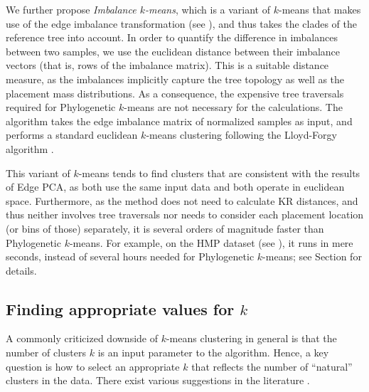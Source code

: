 We further propose \emph{Imbalance $k$-means},
which is a variant of $k$-means that makes use of the edge imbalance transformation
(see ),
and thus takes the clades of the reference tree into account.
In order to quantify the difference in imbalances between two samples,
we use the euclidean distance between their imbalance vectors (that is, rows of the imbalance matrix).
This is a suitable distance measure,
as the imbalances implicitly capture the tree topology as well as the placement mass distributions.
As a consequence, the expensive tree traversals required for Phylogenetic $k$-means are not necessary for the calculations.
The algorithm takes the edge imbalance matrix of normalized samples as input,
and performs a standard euclidean $k$-means clustering following the Lloyd-Forgy algorithm \cite{Lloyd1982,Forgy1965}.

This variant of $k$-means tends to find clusters that are consistent with the results of Edge PCA,
as both use the same input data and both operate in euclidean space. %
Furthermore, as the method does not need to calculate KR distances,
and thus neither involves tree traversals nor needs to consider each placement location (or bins of those) separately,
it is several orders of magnitude faster than Phylogenetic $k$-means.
For example, on the \ac{HMP} dataset (see ),
it runs in mere seconds, instead of several hours needed for Phylogenetic $k$-means;
see Section  for details.


\subsection{Finding appropriate values for \texorpdfstring{$k$}{k}}
\label{ch:Clustering:sec:Methods:sub:FindingK}

A commonly criticized downside of $k$-means clustering in general is
that the number of clusters $k$ is an input parameter to the algorithm.
Hence, a key question is how to select an appropriate $k$
that reflects the number of ``natural'' clusters in the data.
There exist various suggestions in the literature
\cite{Thorndike1953,Rousseeuw1987,Bischof1999,Pelleg2000,Tibshirani2001,Hamerly2004}.

